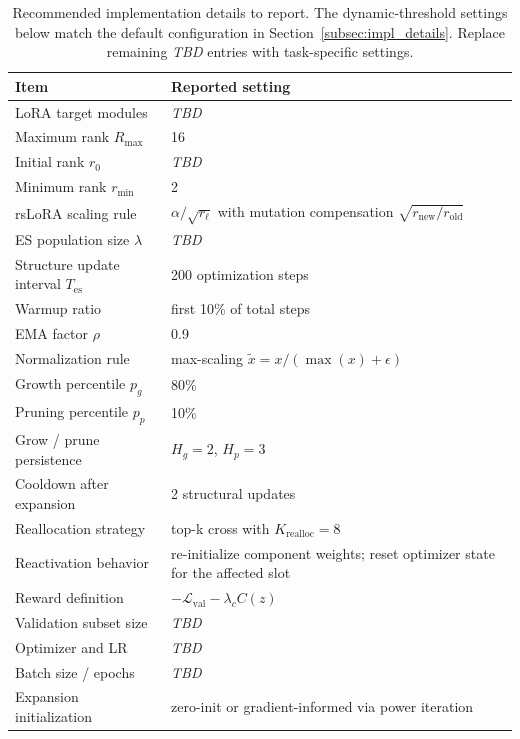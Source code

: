 \documentclass{article}
\newcommand{\Rmax}{R_{\max}}
\newcommand{\TODO}{\textit{TBD}}
\begin{document}
\begin{table}[t]
    \centering
    \caption{Recommended implementation details to report. The dynamic-threshold settings below match the default configuration in Section~\ref{subsec:impl_details}. Replace remaining \TODO{} entries with task-specific settings.}
    \label{tab:hparams}
    \begin{tabularx}{\columnwidth}{>{\raggedright\arraybackslash}p{}X}
        \toprule
        Item & Reported setting \\
        \midrule
        LoRA target modules & \TODO{} \\
        Maximum rank $\Rmax$ & 16 \\
        Initial rank $r_0$ & \TODO{} \\
        Minimum rank $r_{\min}$ & 2 \\
        rsLoRA scaling rule & $\alpha / \sqrt{r_\ell}$ with mutation compensation $\sqrt{r_{\mathrm{new}}/r_{\mathrm{old}}}$ \\
        ES population size $\lambda$ & \TODO{} \\
        Structure update interval $T_{\mathrm{es}}$ & 200 optimization steps \\
        Warmup ratio & first 10\% of total steps \\
        EMA factor $\rho$ & 0.9 \\
        Normalization rule & max-scaling $\tilde{x}=x/(\max(x)+\epsilon)$ \\
        Growth percentile $p_g$ & 80\% \\
        Pruning percentile $p_p$ & 10\% \\
        Grow / prune persistence & $H_g=2$, $H_p=3$ \\
        Cooldown after expansion & 2 structural updates \\
        Reallocation strategy & top-k cross with $K_{\mathrm{realloc}}=8$ \\
        Reactivation behavior & re-initialize component weights; reset optimizer state for the affected slot \\
        Reward definition & $-\mathcal{L}_{\mathrm{val}} - \lambda_c C(z)$ \\
        Validation subset size & \TODO{} \\
        Optimizer and LR & \TODO{} \\
        Batch size / epochs & \TODO{} \\
        Expansion initialization & zero-init or gradient-informed via power iteration \\
        \bottomrule
    \end{tabularx}
\end{table}
\end{document}
